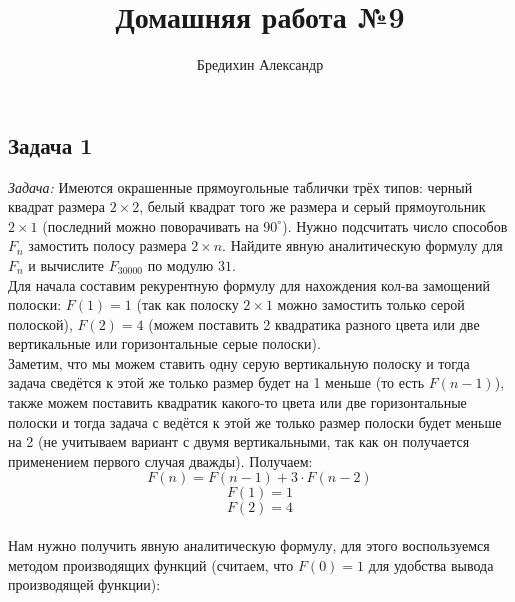 \documentclass[a4paper,12pt]{article} %
\author{Бредихин Александр}
\title{Домашняя работа №9}
\begin{document}
\maketitle

\subsection*{Задача 1}
\textit{Задача:} Имеются окрашенные прямоугольные таблички трёх типов: черный квадрат размера $2\times 2$, белый квадрат того же размера и серый прямоугольник $2\times 1$ (последний можно поворачивать на $90^\circ$). Нужно подсчитать число способов $F_n$ замостить полосу размера $2\times n$. Найдите явную аналитическую формулу для $F_n$ и вычислите $F_{30000}$ по модулю $31$. \smallskip \\

Для начала составим рекурентную формулу для нахождения кол-ва замощений полоски: $ F(1) = 1 $ (так как полоску $2\times 1$ можно замостить только серой полоской), $ F(2) = 4 $ (можем поставить 2 квадратика разного цвета или две вертикальные или горизонтальные серые полоски).\\

Заметим, что мы можем ставить одну серую вертикальную полоску и тогда задача сведётся к этой же только размер будет на 1 меньше (то есть $ F(n-1) $), также можем поставить квадратик какого-то цвета или две горизонтальные полоски и тогда задача с ведётся к этой же только размер полоски будет меньше на 2 (не учитываем вариант с двумя вертикальными, так как он получается применением первого случая дважды). Получаем:\\
$$ F(n) = F(n-1) + 3 \cdot F(n - 2) $$
$$ F(1) = 1$$
$$ F(2) = 4$$\\

Нам нужно получить явную аналитическую формулу, для этого воспользуемся методом производящих функций (считаем, что $ F(0) = 1 $ для удобства вывода производящей функции):\\
\end{document}
